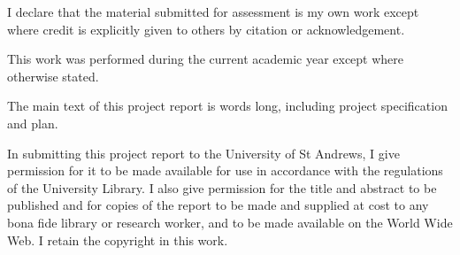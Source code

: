 I declare that the material submitted for assessment is my own work except where credit is explicitly given to others by citation or acknowledgement. 

This work was performed during the current academic year except where otherwise stated. 

The main text of this project report is \textbf{\insertwordcount} words long, including project specification and plan.

In submitting this project report to the University of St Andrews, I give permission for it to be made available for use in accordance with the regulations of the University Library. I also give permission for the title and abstract to be published and for copies of the report to be made and supplied at cost to any bona fide library or research worker, and to be made available on the World Wide Web. I retain the copyright in this work.
\\

\textit{\insertauthor}